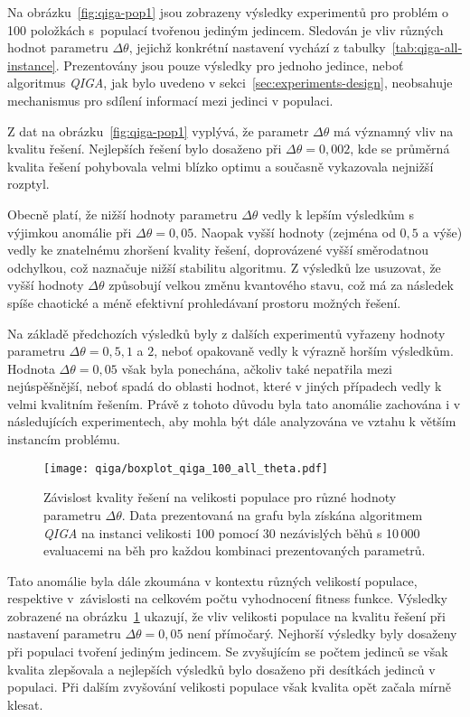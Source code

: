 Na obrázku~\ref{fig:qiga-pop1} jsou zobrazeny výsledky experimentů pro problém o 100 položkách s~populací tvořenou jediným jedincem.
Sledován je vliv různých hodnot parametru $\Delta\theta$, jejichž konkrétní nastavení vychází z tabulky~\ref{tab:qiga-all-instance}. 
Prezentovány jsou pouze výsledky pro jednoho jedince, neboť algoritmus \emph{QIGA}, jak bylo uvedeno v sekci~\ref{sec:experiments-design}, neobsahuje mechanismus pro sdílení informací mezi jedinci v populaci. 

Z dat na obrázku~\ref{fig:qiga-pop1} vyplývá, že parametr $\Delta\theta$ má významný vliv na kvalitu řešení. 
Nejlepších řešení bylo dosaženo při $\Delta\theta = 0,002$, kde se průměrná kvalita řešení pohybovala velmi blízko optimu a současně vykazovala nejnižší rozptyl. 

Obecně platí, že nižší hodnoty parametru $\Delta\theta$ vedly k lepším výsledkům s výjimkou anomálie při $\Delta\theta = 0,05$. 
Naopak vyšší hodnoty (zejména od $0,5$ a výše) vedly ke znatelnému zhoršení kvality řešení, doprovázené vyšší směrodatnou odchylkou, což naznačuje nižší stabilitu algoritmu. 
Z výsledků lze usuzovat, že vyšší hodnoty $\Delta\theta$ způsobují velkou změnu kvantového stavu, což má za následek spíše chaotické a méně efektivní prohledávaní prostoru možných řešení. 

Na základě předchozích výsledků byly z dalších experimentů vyřazeny hodnoty parametru $\Delta\theta = 0,5, 1$ a $2$, neboť opakovaně vedly k výrazně horším výsledkům. 
Hodnota $\Delta\theta = 0,05$ však byla ponechána, ačkoliv také nepatřila mezi nejúspěšnější, neboť spadá do oblasti hodnot, které v jiných případech vedly k velmi kvalitním řešením. 
Právě z tohoto důvodu byla tato anomálie zachována i v následujících experimentech, aby mohla být dále analyzována ve vztahu k větším instancím problému. 

\begin{figure}[ht!]
    \centering
    \texttt{[image: qiga/boxplot\_qiga\_100\_all\_theta.pdf]}
    \caption{Závislost kvality řešení na velikosti populace pro různé hodnoty parametru $\Delta\theta$. Data prezentovaná na grafu byla získána algoritmem \emph{QIGA} na instanci velikosti 100 pomocí 30 nezávislých běhů s 10\,000 evaluacemi na běh pro každou kombinaci prezentovaných parametrů.}
    \label{fig:qiga-100-all}
\end{figure}

Tato anomálie byla dále zkoumána v kontextu různých velikostí populace, respektive v~závislosti na celkovém počtu vyhodnocení fitness funkce. 
Výsledky zobrazené na obrázku~\ref{fig:qiga-100-all} ukazují, že vliv velikosti populace na kvalitu řešení při nastavení parametru $\Delta\theta = 0,05$ není přímočarý. 
Nejhorší výsledky byly dosaženy při populaci tvoření jediným jedincem. 
Se zvyšujícím se počtem jedinců se však kvalita zlepšovala a nejlepších výsledků bylo dosaženo při desítkách jedinců v populaci. 
Při dalším zvyšování velikosti populace však kvalita opět začala mírně klesat.

